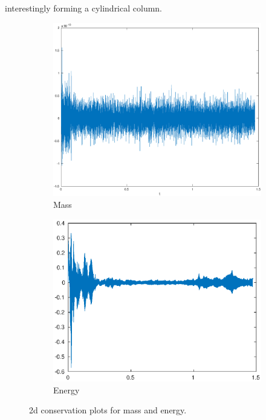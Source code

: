 interestingly forming a cylindrical column.


\begin{figure}[htp]
    \centering
    \begin{subfigure}[b]{0.46\textwidth}
        \centering
        \includegraphics[width=\textwidth]{images/cons_mass.eps}\hfill
        \caption{Mass}
        \label{fig:Energy}
    \end{subfigure}
    \hfill
    \begin{subfigure}[b]{0.45\textwidth}
        \centering
        \includegraphics[width=\textwidth]{images/cons_energy.eps}\hfill
        \caption{Energy}
        \label{fig:Mass}
    \end{subfigure}
    \caption{2d conservation plots for mass and energy.}
    \label{fig:three graphs}
\end{figure}

